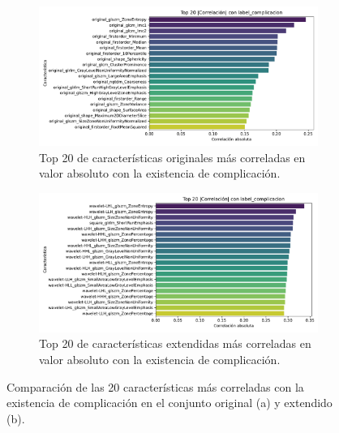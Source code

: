 \begin{figure}[!htbp]
    \centering
    \begin{subfigure}[t]{0.48\textwidth}
        \includegraphics[width=\textwidth]{img/top_features_corr_label_complicacion.pdf}
        \caption{Top 20 de características originales más correladas en valor absoluto con la existencia de complicación.}
        \label{fig:corr_labels_original}
    \end{subfigure}
    \hfill
    \begin{subfigure}[t]{0.48\textwidth}
        \includegraphics[width=\textwidth]{img/ext_top_features_corr_label_complicacion.pdf}
        \caption{Top 20 de características extendidas más correladas en valor absoluto con la existencia de complicación.}
        \label{fig:corr_labels_extended}
    \end{subfigure}
    \caption{Comparación de las 20 características más correladas con la existencia de complicación en el conjunto original (a) y extendido (b).}
    \label{fig:combined_corr_labels}
\end{figure}



